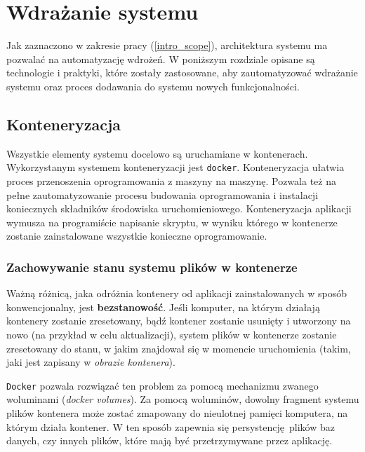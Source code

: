 \chapter{Wdrażanie systemu}

Jak zaznaczono w zakresie pracy (\ref{intro_scope}),
architektura systemu ma pozwalać na automatyzację wdrożeń.
W poniższym rozdziale opisane są technologie i praktyki, które zostały 
zastosowane, aby zautomatyzować wdrażanie systemu oraz proces
dodawania do systemu nowych funkcjonalności.

\section{Konteneryzacja}

Wszystkie elementy systemu docelowo są uruchamiane w kontenerach.
Wykorzystanym systemem konteneryzacji jest \texttt{docker}\cite{docker}.
Konteneryzacja ułatwia proces przenoszenia oprogramowania 
z maszyny na maszynę. Pozwala też na pełne zautomatyzowanie
procesu budowania oprogramowania i instalacji koniecznych
składników środowiska uruchomieniowego. Konteneryzacja
aplikacji wymusza na programiście napisanie skryptu, w wyniku
którego w kontenerze zostanie zainstalowane wszystkie konieczne 
oprogramowanie.

\subsection{Zachowywanie stanu systemu plików w kontenerze} \label{volumes}

Ważną różnicą, jaka odróżnia kontenery od aplikacji zainstalowanych
w sposób konwencjonalny, jest \textbf{bezstanowość}. Jeśli komputer,
na którym działają kontenery zostanie zresetowany, bądź kontener zostanie
usunięty i utworzony na nowo (na przykład w celu aktualizacji), system
plików w kontenerze zostanie zresetowany do stanu, w jakim znajdował się 
w momencie uruchomienia (takim, jaki jest zapisany w \textit{obrazie kontenera}).

\texttt{Docker} pozwala rozwiązać ten problem za pomocą mechanizmu zwanego 
woluminami (\textit{docker volumes})\cite{docker_volumes}.
Za pomocą woluminów, dowolny fragment systemu
plików kontenera może zostać zmapowany do nieulotnej pamięci komputera, na którym 
działa kontener. W ten sposób zapewnia się persystencję plików baz danych, czy innych
plików, które mają być przetrzymywane przez aplikację.\\ %


